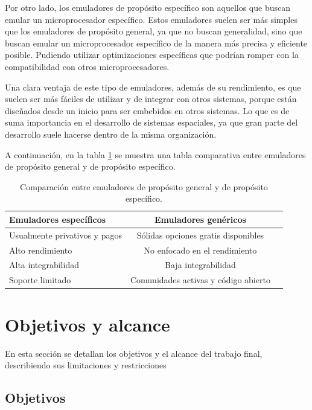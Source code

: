 Por otro lado, los emuladores de propósito específico son aquellos que buscan emular un microprocesador específico. Estos emuladores suelen ser más simples que los emuladores de propósito general, ya que no buscan generalidad, sino que buscan emular un microprocesador específico de la manera más precisa y eficiente posible. Pudiendo utilizar optimizaciones específicas que podrían romper con la compatibilidad con otros microprocesadores.

Una clara ventaja de este tipo de emuladores, además de su rendimiento, es que suelen ser más fáciles de utilizar y de integrar con otros sistemas, porque están diseñados desde un inicio para ser embebidos en otros sistemas. Lo que es de suma importancia en el desarrollo de sistemas espaciales, ya que gran parte del desarrollo suele hacerse dentro de la misma organización.

A continuación, en la tabla \ref{tab:comparacion_emuladores} se muestra una tabla comparativa entre emuladores de propósito general y de propósito específico.

\begin{table}[h]
	\centering
	\caption[Tipos de emuladores]{Comparación entre emuladores de propósito general y de propósito específico.}
	\begin{tabular}{l c c}
		\toprule
		\textbf{Emuladores específicos} & \textbf{Emuladores genéricos} \\
		\midrule
		Usualmente privativos y pagos & Sólidas opciones gratis disponibles	\\
		Alto rendimiento	 & No enfocado en el rendimiento  \\
		Alta integrabilidad	 & Baja integrabilidad	 \\
		Soporte limitado & Comunidades activas y código abierto	 \\
		\bottomrule
		\hline
	\end{tabular}
	\label{tab:comparacion_emuladores}
\end{table}



\section{Objetivos y alcance}
\label{sec:objetivos_alcance}

En esta sección se detallan los objetivos y el alcance del trabajo final, describiendo sus limitaciones y restricciones

\subsection{Objetivos}
\label{subsec:objetivos}

